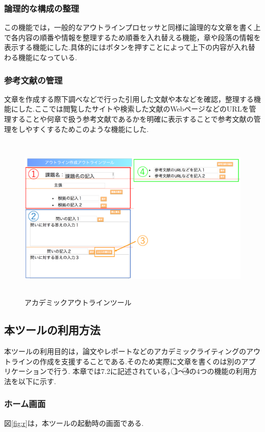 \documentclass[a4j,12pt]{jarticle}
\begin{document}
\subsubsection{論理的な構成の整理}
この機能では，一般的なアウトラインプロセッサと同様に論理的な文章を書く上で各内容の順番や情報を整理するため順番を入れ替える機能，章や段落の情報を表示する機能にした.具体的にはボタンを押すことによって上下の内容が入れ替わる機能になっている.

\subsubsection{参考文献の管理}
文章を作成する際下調べなどで行った引用した文献や本などを確認，整理する機能にした.ここでは閲覧したサイトや検索した文献のWebページなどのURLを管理することや何章で扱う参考文献であるかを明確に表示することで参考文献の管理をしやすくするためこのような機能にした.
\newpage
\begin{figure}[h]
\begin{center}
 \includegraphics[clip,width=130mm,height=80mm]{figure/pp01.pdf}
\end{center}
 \caption{アカデミックアウトラインツール}
 \label{fig:g}
\end{figure}
\newpage
\subsection{本ツールの利用方法}
本ツールの利用目的は，論文やレポートなどのアカデミックライティングのアウトラインの作成を支援することである.そのため実際に文章を書くのは別のアプリケーションで行う.
本章では7.2に記述されている，\textcircled{\scriptsize 1}〜\textcircled{\scriptsize  4}の4つの機能の利用方法を以下に示す.

\subsubsection{ホーム画面}
図\ref{fig:r}は，本ツールの起動時の画面である.
\end{document}
